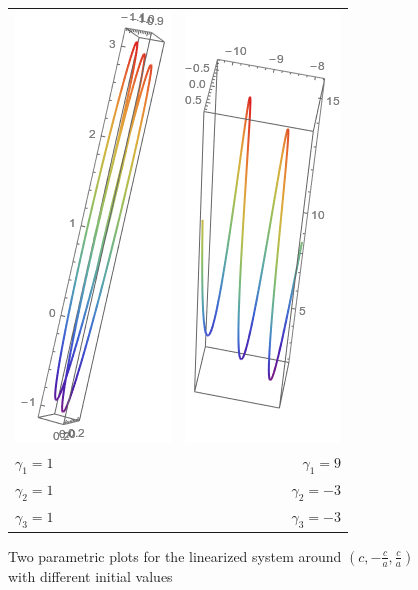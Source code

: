 \documentclass{article}
\begin{document}
\begin{figure}[h]
	\centering
	\begin{tabular}{l r}
		\includegraphics[scale=0.5]{gen_sln_02_01} & \includegraphics[scale=0.5]{gen_sln_02_02} \\
		$\gamma_{1}=1$                             & $\gamma_{1}=9$                             \\
		$\gamma_{2}=1$                             & $\gamma_{2}=-3$                            \\
		$\gamma_{3}=1$                             & $\gamma_{3}=-3$                            \\
	\end{tabular}
	\caption{Two parametric plots for the linearized system around $(c,-\frac{c}{a}, \frac{c}{a})$ with different initial values}
	\label{fig:nzero_sln}
\end{figure}
\end{document}
